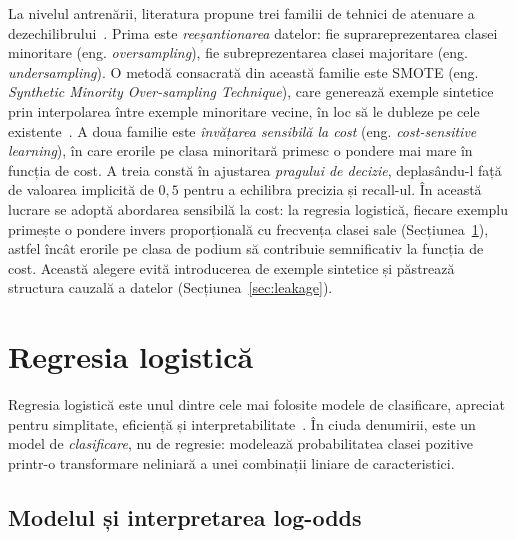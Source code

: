 \documentclass[12pt,a4paper]{report}
\begin{document}
La nivelul antrenării, literatura propune trei familii de tehnici de atenuare a
dezechilibrului~\cite{he2009learning}. Prima este \emph{reeșantionarea} datelor: fie
suprareprezentarea clasei minoritare (eng. \emph{oversampling}), fie subreprezentarea clasei
majoritare (eng. \emph{undersampling}). O metodă consacrată din această familie este SMOTE
(eng. \emph{Synthetic Minority Over-sampling Technique}), care generează exemple sintetice prin
interpolarea între exemple minoritare vecine, în loc să le dubleze pe cele
existente~\cite{chawla2002smote}. A doua familie este \emph{învățarea sensibilă la cost} (eng.
\emph{cost-sensitive learning}), în care erorile pe clasa minoritară primesc o pondere mai mare
în funcția de cost. A treia constă în ajustarea \emph{pragului de decizie}, deplasându-l față de
valoarea implicită de $0{,}5$ pentru a echilibra precizia și recall-ul. În această lucrare se
adoptă abordarea sensibilă la cost: la regresia logistică, fiecare exemplu primește o pondere
invers proporțională cu frecvența clasei sale (Secțiunea~\ref{sec:logreg}), astfel încât erorile
pe clasa de podium să contribuie semnificativ la funcția de cost. Această alegere evită
introducerea de exemple sintetice și păstrează structura cauzală a datelor (Secțiunea~\ref{sec:leakage}).

\section{Regresia logistică}
\label{sec:logreg}

Regresia logistică este unul dintre cele mai folosite modele de clasificare, apreciat pentru
simplitate, eficiență și interpretabilitate~\cite{hastie2009elements, james2013introduction}. În
ciuda denumirii, este un model de \emph{clasificare}, nu de regresie: modelează probabilitatea
clasei pozitive printr-o transformare neliniară a unei combinații liniare de caracteristici.

\subsection{Modelul și interpretarea log-odds}
\end{document}
